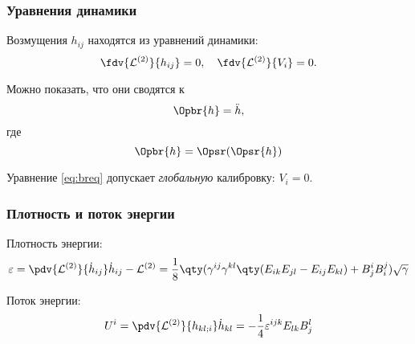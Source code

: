 \documentclass[compress]{beamer}
\begin{document}

    \begin{frame}\frametitle{Уравнения динамики}

        Возмущения $h_{ij}$ находятся из уравнений динамики:
        \begin{equation*}
            \fdv{\mathcal{L}^{(2)}}{h_{ij}} = 0, \quad
            \fdv{\mathcal{L}^{(2)}}{V_i} = 0 .
        \end{equation*}

        Можно показать, что они сводятся к
        \begin{equation}\label{eq:breq}
            \Opbr{h} = \ddot{h} ,
        \end{equation}
        где
        \begin{equation*}
            \Opbr{h} = \Opsr(\Opsr{h})
        \end{equation*}

        Уравнение \autoref{eq:breq} допускает \textit{глобальную} калибровку: $V_i = 0$.

    \end{frame}


    \begin{frame}\frametitle{Плотность и поток энергии}

        Плотность энергии:
        \begin{equation*}
            \varepsilon = \pdv{\mathcal{L}^{(2)}}{\dot{h}_{ij}} \dot{h}_{ij} - \mathcal{L}^{(2)}
                        = \frac{1}{8} \qty(
                \gamma^{ij} \gamma^{kl} \qty(
                    E_{ik} E_{jl} - E_{ij} E_{kl}
                ) + B^i_j B^j_i
            ) \sqrt{\gamma}
        \end{equation*}

        Поток энергии:
        \begin{equation*}
            U^i = \pdv{\mathcal{L}^{(2)}}{h_{kl;i}} \dot{h}_{kl}
                = -\frac{1}{4}\varepsilon^{ijk} E_{lk} B^l_j
        \end{equation*}

    \end{frame}
\end{document}
